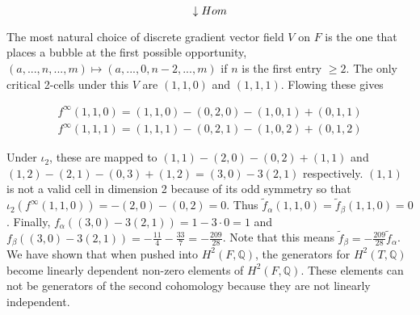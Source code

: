\documentclass{amsart}
\newcommand{\bq}{\ensuremath{\mathbb{Q}}} %
\begin{document}
\bigskip 															

\begin{center}
	
	
\end{center}

\bigskip 			

$$ \boldmath{\downarrow Hom}$$												

\begin{center}
		
\end{center}

\bigskip

The most natural choice of discrete gradient vector field $V$ on $F$ is the one that places a bubble at the first possible opportunity, $(a,...,n,...,m) \mapsto (a,...,0,n-2,...,m)$ if $n$ is the first entry $\geq 2$. The only critical 2-cells under this $V$ are $(1,1,0)$ and $(1,1,1)$. Flowing these gives 

\begin{gather*}
f^{\infty}(1,1,0) = (1,1,0) - (0,2,0) - (1,0,1) + (0,1,1)\\ 
f^{\infty}(1,1,1) = (1,1,1) - (0,2,1) - (1,0,2) + (0,1,2)
\end{gather*}

Under $\iota_{2}$, these are mapped to $(1,1) - (2,0) - (0,2) + (1,1)$ and $(1,2) - (2,1) - (0,3) + (1,2) = (3,0) - 3(2,1)$ respectively. $(1,1)$ is not a valid cell in dimension 2 because of its odd symmetry so that $\iota_{2}(f^{\infty}(1,1,0)) = -(2,0) - (0,2) = 0$. Thus $\widetilde{f}_{\alpha}(1,1,0) = \widetilde{f}_{\beta}(1,1,0) = 0$. Finally, $f_{\alpha}((3,0)-3(2,1)) = 1 - 3 \cdot 0 = 1$ and $f_{\beta}((3,0)-3(2,1)) = -\frac{11}{4} - \frac{33}{7} = - \frac{209}{28}$. Note that this means $\widetilde{f}_{\beta} = -\frac{209}{28}\widetilde{f}_{\alpha}$. We have shown that when pushed into $H^{2}(F, \bq)$, the generators for $H^{2}(T, \bq)$ become linearly dependent non-zero elements of $H^{2}(F, \bq)$. These elements can not be generators of the second cohomology because they are not linearly independent. 
\end{document}
